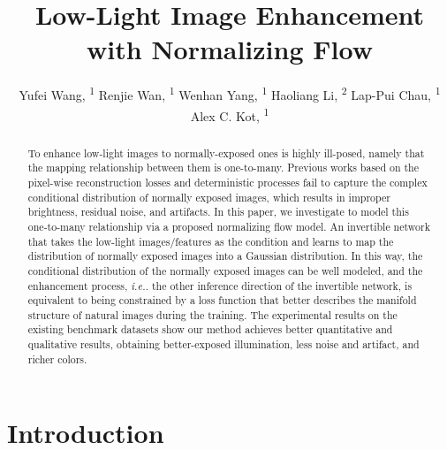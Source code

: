 \documentclass[letterpaper]{article} \usepackage{aaai22}  \usepackage{times}  \usepackage{helvet}  \usepackage{courier}  \usepackage[hyphens]{url}  \usepackage{graphicx} \urlstyle{rm} \def\UrlFont{\rm}  \usepackage{natbib}  \usepackage{caption} \usepackage{subfigure}
\title{Low-Light Image Enhancement with Normalizing Flow}
\author {
Yufei Wang, \textsuperscript{\rm 1}
    Renjie Wan, \textsuperscript{\rm 1}
    Wenhan Yang, \textsuperscript{\rm 1}
    Haoliang Li, \textsuperscript{\rm 2}
    Lap-Pui Chau, \textsuperscript{\rm 1}
    Alex C. Kot, \textsuperscript{\rm 1}
}
\def\ie{\emph{i.e.}}
\def\ie{{\emph{i.e.}}}
\begin{document}
\maketitle

\begin{abstract}
To enhance low-light images to normally-exposed ones is highly ill-posed, namely that the mapping relationship between them is one-to-many. Previous works based on the pixel-wise reconstruction losses and deterministic processes fail to capture the complex conditional distribution of normally exposed images, which results in improper brightness, residual noise, and artifacts. In this paper, we investigate to model this one-to-many relationship via a proposed normalizing flow model. 
An invertible network that takes the low-light images/features as the condition and learns to map the distribution of normally exposed images into a Gaussian distribution. In this way, the conditional distribution of the normally exposed images can be well modeled, and the enhancement process, \ie. the other inference direction of the invertible network, is equivalent to being constrained by a loss function that better describes the manifold structure of natural images during the training.
The experimental results on the existing benchmark datasets show our method achieves better quantitative and qualitative results, obtaining better-exposed illumination, less noise and artifact, and richer colors.
\end{abstract}
\section{Introduction}
\label{sec:introduction}
\end{document}
